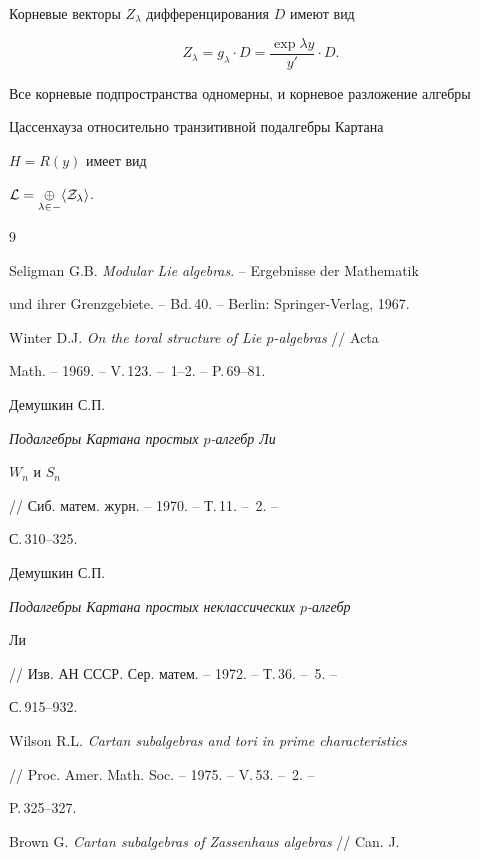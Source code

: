 Корневые векторы $Z_\lambda$ дифференцирования $D$ имеют вид


$$


Z_\lambda=g_\lambda\cdot D=\frac{\exp\lambda y}{y'}\cdot D.


$$


Все корневые подпространства одномерны, и корневое разложение алгебры


Цассенхауза относительно транзитивной подалгебры Картана


$H=R(y)$ имеет вид


$\cal L=\underset{\lambda\in\Gamma}{\oplus}{}\langle Z_\lambda\rangle$.





\begin{thebibliography}{9}







Seligman G.B. {\em Modular Lie algebras}. -- Ergebnisse der Mathematik


und ihrer Grenzgebiete. -- Bd.\,40. -- Berlin: Springer-Verlag, 1967.




Winter D.J. {\em On the toral structure of Lie $p$-algebras} // Acta


Math. -- 1969. -- V.\,123. -- \No\,1--2. -- P.\,69--81.




Демушкин С.П. {\em Подалгебры Картана простых $p$-алгебр Ли


$W_n$ и $S_n$} // Сиб. матем. журн. -- 1970. -- Т.\,11. -- \No\,2. --


С.\,310--325.




Демушкин С.П. {\em Подалгебры Картана простых неклассических $p$-алгебр


Ли} // Изв. АН СССР. Сер. матем. -- 1972. -- Т.\,36. -- \No\,5. --


С.\,915--932.




Wilson R.L. {\em Cartan subalgebras and tori in prime characteristics}


// Proc. Amer. Math. Soc. -- 1975. -- V.\,53. -- \No\,2. --


P.\,325--327.




Brown G. {\em Cartan subalgebras of Zassenhaus algebras} // Can. J.



\end{thebibliography}
